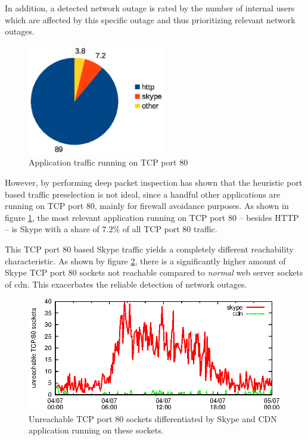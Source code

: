 In addition, a detected network outage is rated by the number of internal users 
which are affected by this specific outage and thus prioritizing relevant 
network outages.

\begin{figure}
	[ht] \centering
	\includegraphics[width=6cm]{images/application_fact_port_80.eps}
	\caption{Application traffic running on TCP port 80 \citep{SchatzmanThesis2012}} 
	\label{fig:tcp_port80}
\end{figure}

However, by performing deep packet inspection \citet{SchatzmanThesis2012} has 
shown that the heuristic port based traffic preselection is not ideal, since a 
handful other applications are running on \gls{TCP}  port 80, mainly for 
firewall avoidance purposes. As shown in figure \ref{fig:tcp_port80}, the most 
relevant application running on \gls{TCP} port 80 -- besides \gls{HTTP} --
is Skype with a share of $7.2\%$ of all \gls{TCP} port 80 traffic. 

This \gls{TCP} port 80 based Skype traffic yields a completely different 
reachability characteristic. 
As shown by figure \ref{fig:skype_traffic}, there is a 
significantly higher amount of Skype \gls{TCP} port 80 sockets not reachable 
compared to \emph{normal} web server sockets of \gls{cdn}. This exacerbates the 
reliable detection of network outages. 

\begin{figure}
	[ht] \centering
	\includegraphics[width=12cm]{images/application_fact.eps}
	\caption{Unreachable TCP port 80 sockets differentiated by Skype and CDN application running on these sockets. \citep{SchatzmanThesis2012}} 
	\label{fig:skype_traffic}
\end{figure}

